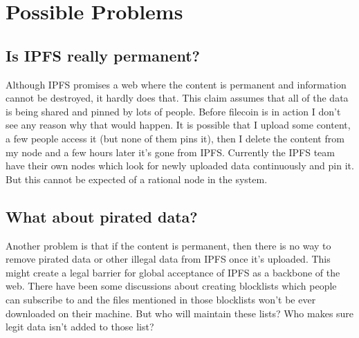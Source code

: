 \chapter{Possible Problems}

\section{Is IPFS really permanent?}

Although IPFS promises a web where the content is permanent and information cannot be destroyed, it hardly does that. This claim assumes that all of the data is being shared and pinned by lots of people. Before filecoin is in action I don't see any reason why that would happen. It is possible that I upload some content, a few people access it (but none of them pins it), then I delete the content from my node and a few hours later it's gone from IPFS. Currently the IPFS team have their own nodes which look for newly uploaded data continuously and pin it. But this cannot be expected of a rational node in the system.

\section{What about pirated data?}
Another problem is that if the content is permanent, then there is no way to remove pirated data or other illegal data from IPFS once it's uploaded. This might create a legal barrier for global acceptance of IPFS as a backbone of the web. There have been some discussions about creating blocklists which people can subscribe to and the files mentioned in those blocklists won't be ever downloaded on their machine. But who will maintain these lists? Who makes sure legit data isn't added to those list? 
